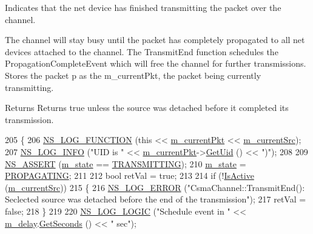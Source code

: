 Indicates that the net device has finished transmitting the packet over the channel. 

The channel will stay busy until the packet has completely propagated to all net devices attached to the channel. The Transmit\+End function schedules the Propagation\+Complete\+Event which will free the channel for further transmissions. Stores the packet p as the m\+\_\+current\+Pkt, the packet being currently transmitting.

\begin{DoxyReturn}{Returns}
Returns true unless the source was detached before it completed its transmission. 
\end{DoxyReturn}

\begin{DoxyCode}
205 \{
206   \hyperlink{log-macros-disabled_8h_a90b90d5bad1f39cb1b64923ea94c0761}{NS\_LOG\_FUNCTION} (\textcolor{keyword}{this} << \hyperlink{classns3_1_1CsmaChannel_aa6402963543ed7ae413acb321a66101b}{m\_currentPkt} << 
      \hyperlink{classns3_1_1CsmaChannel_af6c1065e71e65be876ab8968c9d54c83}{m\_currentSrc});
207   \hyperlink{group__logging_gafbd73ee2cf9f26b319f49086d8e860fb}{NS\_LOG\_INFO} (\textcolor{stringliteral}{"UID is "} << \hyperlink{classns3_1_1CsmaChannel_aa6402963543ed7ae413acb321a66101b}{m\_currentPkt}->\hyperlink{classns3_1_1Packet_a1f212c825b50e54d94f5b9ae99592e6a}{GetUid} () << \textcolor{stringliteral}{")"});
208 
209   \hyperlink{assert_8h_a6dccdb0de9b252f60088ce281c49d052}{NS\_ASSERT} (\hyperlink{classns3_1_1CsmaChannel_a9c0532c38d511b589274e726ad41037f}{m\_state} == \hyperlink{namespacens3_aff37503a9e9f2dbe82b374050a73e105a5c6ba0512d778b658dc105cc604de3b3}{TRANSMITTING});
210   \hyperlink{classns3_1_1CsmaChannel_a9c0532c38d511b589274e726ad41037f}{m\_state} = \hyperlink{namespacens3_aff37503a9e9f2dbe82b374050a73e105ac733aeba726ca997bf6790fa0e28fede}{PROPAGATING};
211 
212   \textcolor{keywordtype}{bool} retVal = \textcolor{keyword}{true};
213 
214   \textcolor{keywordflow}{if} (!\hyperlink{classns3_1_1CsmaChannel_a53b1fd4d944f8342f96477a2d6ade7fc}{IsActive} (\hyperlink{classns3_1_1CsmaChannel_af6c1065e71e65be876ab8968c9d54c83}{m\_currentSrc}))
215     \{
216       \hyperlink{group__logging_ga0261a8db1d4ac5f79417d117634fd455}{NS\_LOG\_ERROR} (\textcolor{stringliteral}{"CsmaChannel::TransmitEnd(): Seclected source was detached before the end
       of the transmission"});
217       retVal = \textcolor{keyword}{false};
218     \}
219 
220   \hyperlink{group__logging_ga88acd260151caf2db9c0fc84997f45ce}{NS\_LOG\_LOGIC} (\textcolor{stringliteral}{"Schedule event in "} << \hyperlink{classns3_1_1CsmaChannel_a7289f240118c52453fbac6b9b74ff83e}{m\_delay}.\hyperlink{classns3_1_1Time_a8f20d5c3b0902d7b4320982f340b57c8}{GetSeconds} () << \textcolor{stringliteral}{" sec"});

\end{DoxyCode}
